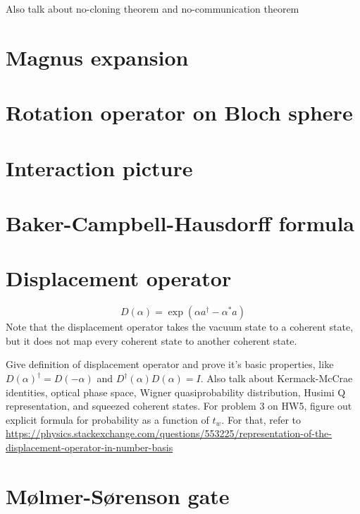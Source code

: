 \documentclass{article}
\begin{document}
Also talk about no-cloning theorem and no-communication theorem
\section{Magnus expansion}
\section{Rotation operator on Bloch sphere}
\section{Interaction picture}
\section{Baker-Campbell-Hausdorff formula}
\section{Displacement operator}
\[ D(\alpha) = \exp \left( \alpha a^\dag -\alpha^* a \right)  \]
Note that the displacement operator takes the vacuum state to a coherent state, but it does not map every coherent state to another coherent state.
\par
Give definition of displacement operator and prove it's basic properties, like $D(\alpha)^\dag = D(-\alpha)$ and $D^\dag(\alpha)D(\alpha)=I$. Also talk about Kermack-McCrae identities, optical phase space, Wigner quasiprobability distribution, Husimi Q representation, and squeezed coherent states. For problem 3 on HW5, figure out explicit formula for probability as a function of $t_w$. For that, refer to \url{https://physics.stackexchange.com/questions/553225/representation-of-the-displacement-operator-in-number-basis}
\section{Mølmer-Sørenson gate}
\end{document}
